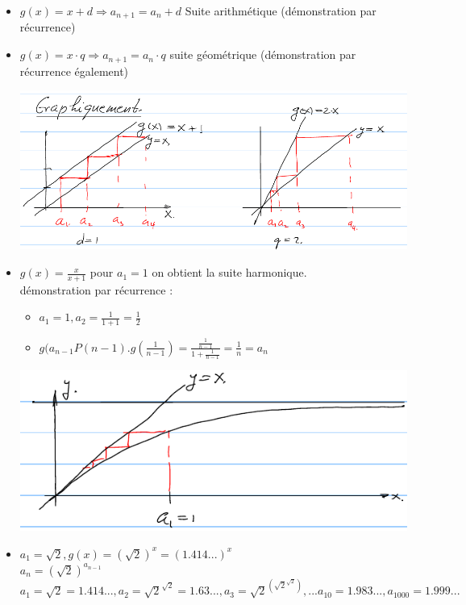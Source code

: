 \documentclass[12pt,a4paper]{article}
\begin{document}
{\begin{itemize}
\item $g(x) = x+d \Rightarrow a_{n+1} = a_n + d$ Suite arithmétique (démonstration par récurrence)
\item $g(x) = x \cdot q \Rightarrow a_{n+1} = a_n \cdot q$ suite géométrique (démonstration par récurrence également)\\
	\begin{flushleft}
		\includegraphics[scale=0.7]{illustrations_Analyse/graph_suite_geom}
	\end{flushleft}	
\item $g(x) = \frac{x}{x+1}$ pour $a_1 = 1$ on obtient la suite harmonique.\\
démonstration par récurrence :\\
\begin{itemize}
	\item $a_1 = 1, a_2 = \frac{1}{1+1} = \frac{1}{2}$
	\item $g(a_{n-1}  P(n-1). g(\frac{1}{n-1}) = \frac{\frac{1}{n-1}}{1+\frac{1}{n-1}} = \frac{1}{n} = a_n$
\end{itemize}
\includegraphics[scale=0.5]{illustrations_Analyse/graph_suite_harmo}
\item $a_1 = \sqrt{2}, g(x) = (\sqrt{2})^x = (1.414...)^x$\\
$a_n = (\sqrt{2})^{a_{n-1}}$\\
$a_1 = \sqrt{2}= 1.414..., a_2 = \sqrt{2}^{\sqrt{2}} = 1.63..., a_3 = \sqrt{2}^{(\sqrt{2}^{\sqrt{2}})},...a_{10} = 1.983..., a_{1000} = 1.999...$\\

\end{itemize}}
\end{document}
